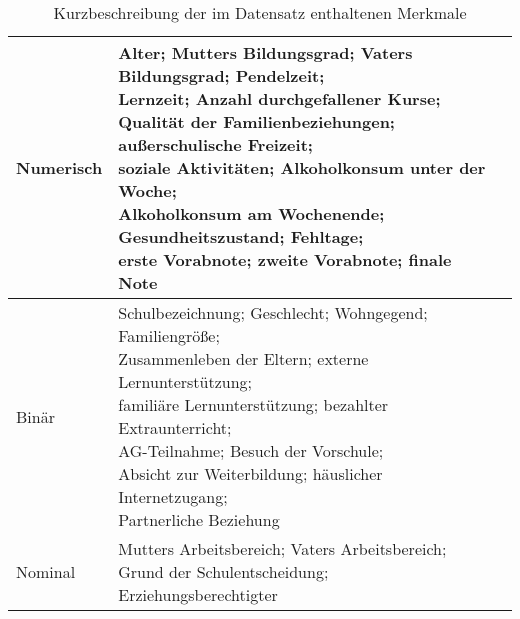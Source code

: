 \begin{table}[htb]
    \centering
    \caption{Kurzbeschreibung der im Datensatz enthaltenen Merkmale}
    \label{tab:Table2.1}
    \begin{tabular}{|l|l|l|}
    \hline
        Numerisch & \makecell[l]{Alter; Mutters Bildungsgrad; Vaters Bildungsgrad; Pendelzeit; \\Lernzeit; Anzahl durchgefallener Kurse; \\Qualität der Familienbeziehungen; außerschulische Freizeit; \\soziale Aktivitäten; Alkoholkonsum unter der Woche; \\Alkoholkonsum am Wochenende; Gesundheitszustand; Fehltage; \\\textbf{erste Vorabnote; zweite Vorabnote; finale Note}} \\ \hline
        Binär & \makecell[l]{Schulbezeichnung; Geschlecht; Wohngegend; Familiengröße; \\Zusammenleben der Eltern; externe Lernunterstützung; \\familiäre Lernunterstützung; bezahlter Extraunterricht; \\AG-Teilnahme; Besuch der Vorschule; \\Absicht zur Weiterbildung; häuslicher Internetzugang; \\Partnerliche Beziehung} \\ \hline
        Nominal & \makecell[l]{Mutters Arbeitsbereich; Vaters Arbeitsbereich; \\Grund der Schulentscheidung; Erziehungsberechtigter} \\ \hline
    \end{tabular}
\end{table}